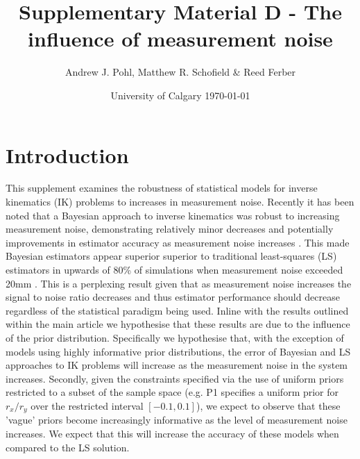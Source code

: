 \documentclass{article}
\title{Supplementary Material D - The influence of measurement noise}
\author{Andrew J. Pohl, Matthew R. Schofield \&  Reed Ferber}
\date{University of Calgary \today}
\begin{document}
\linenumbers
\maketitle 

\doublespacing

\section{Introduction}
This supplement examines the robustness of statistical models for inverse kinematics (IK) problems to increases in measurement noise.  Recently it has been noted that a Bayesian approach to inverse kinematics was robust to increasing measurement noise, demonstrating relatively minor decreases and potentially improvements in estimator accuracy as measurement noise increases \citep{serrien_bayesian_2020}.  This made Bayesian estimators appear superior superior to traditional least-squares (LS) estimators in upwards of 80\% of simulations when measurement noise exceeded 20\si{\milli\meter} \citep{serrien_bayesian_2020}.  This is a perplexing result given that as measurement noise increases the signal to noise ratio decreases and thus estimator performance should decrease regardless of the statistical paradigm being used.  Inline with the results outlined within the main article we hypothesise that these results are due to the influence of the prior distribution.  Specifically we hypothesise that, with the exception of models using highly informative prior distributions, the error of Bayesian and LS approaches to IK problems will increase as the measurement noise in the system increases.  Secondly, given the constraints specified via the use of uniform priors restricted to a subset of the sample space (e.g. P1 specifies a uniform prior for $r_x/r_y$ over the restricted interval $[-0.1, 0.1]$), we expect to observe that these 'vague' priors become increasingly informative as the level of measurement noise increases.  We expect that this will increase the accuracy of these models when compared to the LS solution.
\end{document}
